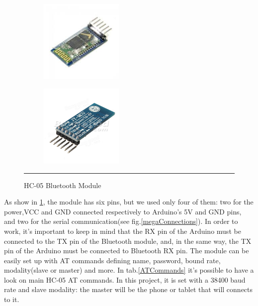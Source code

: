 \begin{figure}[h]
	\centering
	\begin{subfigure}[b]{0.4\textwidth}
		\includegraphics[width=4cm]{hc05-1}
	\end{subfigure}
	\begin{subfigure}[b]{0.4\textwidth}
		\includegraphics[width=4cm]{hc05-2}
	\end{subfigure}
	\rule{35em}{0.5pt}
	\caption{HC-05 Bluetooth Module}
	\label{HC-05}
\end{figure}
As show in \ref{HC-05}, the module has six pins, but we used only four of them: two for the power,VCC and GND connected respectively to Arduino's 5V and GND pins, and two for the serial communication(see fig.\ref{megaConnections}).
In order to work, it's important to keep in mind that the RX pin of the Arduino must be connected to the TX pin of the Bluetooth module, and, in the same way, the TX pin of the Arduino must be connected to Bluetooth RX pin.
The module can be easily set up with AT commands defining name, password, bound rate, modality(slave or master) and more.
In tab.\ref{ATCommands} it's possible to have a look on main HC-05 AT commands.
In this project, it is set with a 38400 baud rate and slave modality: the master will be the phone or tablet that will connects to it.
\\
